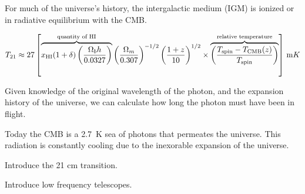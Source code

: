 \begin{bibunit}
For much of the universe's history, the intergalactic medium (IGM) is ionized or in radiative
equilibrium with the CMB.


\begin{equation}
    T_{21} \approx 27 \left[
        \overbrace{
            x_\text{HI} (1+\delta)
            \left(\frac{\Omega_b h}{0.0327}\right)
        }^{\text{quantity of HI}}
        \left(\frac{\Omega_m}{0.307}\right)^{-1/2}
        \left(\frac{1+z}{10}\right)^{1/2} \linebreak \times
        \overbrace{
            \left(\frac{T_\text{spin} - T_\text{CMB}(z)}{T_\text{spin}}\right)
        }^{\text{relative temperature}}
    \right] \, {\rm mK}
\end{equation}
\citep{2012RPPh...75h6901P}






Given knowledge of the
original wavelength of the photon, and the expansion history of the universe, we can calculate how
long the photon must have been in flight.


Today the CMB is a 2.7~K sea of photons that permeates the universe. This radiation is constantly
cooling due to the inexorable expansion of the universe.


Introduce the 21 cm transition.

Introduce low frequency telescopes.












\end{bibunit}

